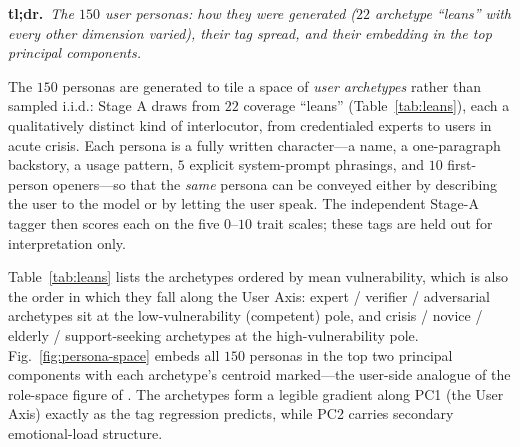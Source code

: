 \documentclass{article}
\begin{document}
\noindent\textbf{tl;dr.}~\emph{The $150$ user personas: how they were generated ($22$
archetype ``leans'' with every other dimension varied), their tag spread, and their
embedding in the top principal components.}\par\medskip
The $150$ personas are generated to tile a space of \emph{user archetypes} rather
than sampled i.i.d.: Stage A draws from $22$ coverage ``leans'' (Table~\ref{tab:leans}),
each a qualitatively distinct kind of interlocutor, from credentialed experts to
users in acute crisis. Each persona is a fully written character---a name, a
one-paragraph backstory, a usage pattern, $5$ explicit system-prompt phrasings,
and $10$ first-person openers---so that the \emph{same} persona can be conveyed
either by describing the user to the model or by letting the user speak. The
independent Stage-A tagger then scores each on the five $0$--$10$ trait scales;
these tags are held out for interpretation only.

Table~\ref{tab:leans} lists the archetypes ordered by mean vulnerability, which is
also the order in which they fall along the User Axis: expert / verifier / adversarial
archetypes sit at the low-vulnerability (competent) pole, and crisis / novice /
elderly / support-seeking archetypes at the high-vulnerability pole.
Fig.~\ref{fig:persona-space} embeds all $150$ personas in the top two principal
components with each archetype's centroid marked---the user-side analogue of the
role-space figure of \citet{lu2024assistant}. The archetypes form a legible
gradient along PC1 (the User Axis) exactly as the tag regression predicts, while
PC2 carries secondary emotional-load structure.
\end{document}
